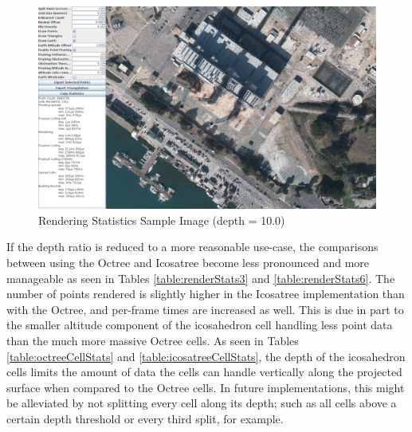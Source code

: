 \begin{figure}[htp]
\begin{center}
  \includegraphics[width=6.0in]{images/rendering10.png}
  \caption{Rendering Statistics Sample Image (depth = 10.0)}
  \label{fig:rendering10}
\end{center}
\end{figure}

If the depth ratio is reduced to a more reasonable use-case, the comparisons
between using the Octree and Icosatree become less pronounced and more
manageable as seen in Tables \ref{table:renderStats3} and
\ref{table:renderStats6}.
The number of points rendered is slightly higher in the Icosatree implementation
than with the Octree, and per-frame times are increased as well. This is due in
part to the smaller altitude component of the icosahedron cell handling less
point data than the much more massive Octree cells. As seen in Tables
\ref{table:octreeCellStats} and \ref{table:icosatreeCellStats}, the depth of the
icosahedron cells limits the amount of data the cells can handle vertically
along the projected surface when compared to the Octree cells. In future
implementations, this might be alleviated by not splitting every cell along its
depth; such as all cells above a certain depth threshold or every third split,
for example.

\begin{table}[htp]
\caption{Rendering Statistics}
\label{table:renderStats3}
\end{table}

